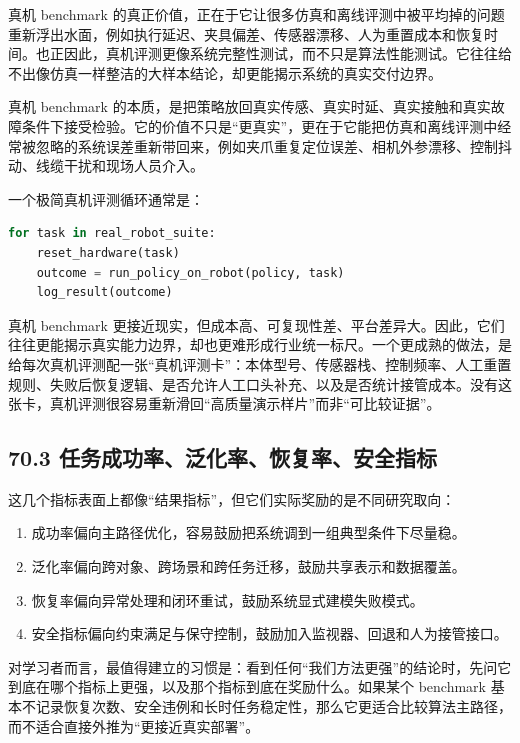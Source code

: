 真机 benchmark 的真正价值，正在于它让很多仿真和离线评测中被平均掉的问题重新浮出水面，例如执行延迟、夹具偏差、传感器漂移、人为重置成本和恢复时间。也正因此，真机评测更像系统完整性测试，而不只是算法性能测试。它往往给不出像仿真一样整洁的大样本结论，却更能揭示系统的真实交付边界。

真机 benchmark 的本质，是把策略放回真实传感、真实时延、真实接触和真实故障条件下接受检验。它的价值不只是“更真实”，更在于它能把仿真和离线评测中经常被忽略的系统误差重新带回来，例如夹爪重复定位误差、相机外参漂移、控制抖动、线缆干扰和现场人员介入。

一个极简真机评测循环通常是：

\begin{lstlisting}[language=python]
for task in real_robot_suite:
    reset_hardware(task)
    outcome = run_policy_on_robot(policy, task)
    log_result(outcome)
\end{lstlisting}

真机 benchmark 更接近现实，但成本高、可复现性差、平台差异大。因此，它们往往更能揭示真实能力边界，却也更难形成行业统一标尺。一个更成熟的做法，是给每次真机评测配一张“真机评测卡”：本体型号、传感器栈、控制频率、人工重置规则、失败后恢复逻辑、是否允许人工口头补充、以及是否统计接管成本。没有这张卡，真机评测很容易重新滑回“高质量演示样片”而非“可比较证据”。

\subsection*{70.3 任务成功率、泛化率、恢复率、安全指标}


这几个指标表面上都像“结果指标”，但它们实际奖励的是不同研究取向：

\begin{enumerate}
\item 成功率偏向主路径优化，容易鼓励把系统调到一组典型条件下尽量稳。
\item 泛化率偏向跨对象、跨场景和跨任务迁移，鼓励共享表示和数据覆盖。
\item 恢复率偏向异常处理和闭环重试，鼓励系统显式建模失败模式。
\item 安全指标偏向约束满足与保守控制，鼓励加入监视器、回退和人为接管接口。
\end{enumerate}

对学习者而言，最值得建立的习惯是：看到任何“我们方法更强”的结论时，先问它到底在哪个指标上更强，以及那个指标到底在奖励什么。如果某个 benchmark 基本不记录恢复次数、安全违例和长时任务稳定性，那么它更适合比较算法主路径，而不适合直接外推为“更接近真实部署”。

